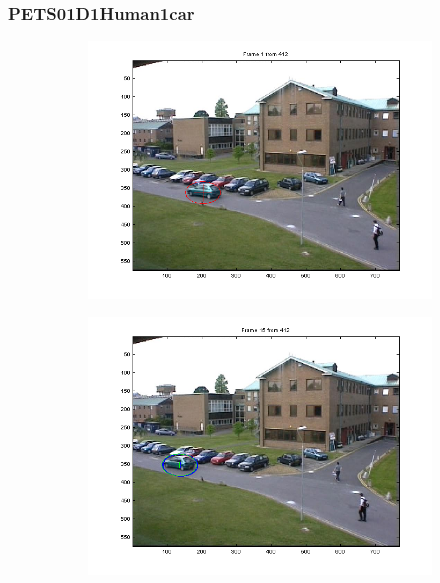 \documentclass[hyperref={pdfpagelabels=false}]{beamer}
\begin{document}
\begin{frame}
\frametitle{PETS01D1Human1car}
\begin{figure}
         \centering
         \begin{subfigure}[b]{0.3\textwidth}
                 \includegraphics[width=\textwidth]{results/PETS01D1Human1car/Frame0001.png}
         \end{subfigure}%
         \begin{subfigure}[b]{0.3\textwidth}
                 \includegraphics[width=\textwidth]{results/PETS01D1Human1car/Frame0015.png}
         \end{subfigure}
         \begin{subfigure}[b]{0.3\textwidth}

\end{subfigure}
\end{figure}
\end{frame}
\end{document}
